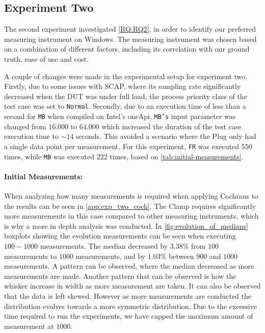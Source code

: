 \subsection{Experiment Two}\label{subsec:exp_two}

The second experiment investigated \cref{RQ:RQ2}, in order to identify our preferred measuring instrument on Windows. The measuring instrument was chosen based on a combination of different factors, including its correlation with our ground truth, ease of use and cost. 

A couple of changes were made in the experimental setup for experiment two. Firstly, due to some issues with SCAP, where its sampling rate significantly decreased when the DUT was under full load, the process priority class of the test case was set to \texttt{Normal}. Secondly, due to an execution time of less than a second for \texttt{MB} when compiled on Intel's oneApi, \texttt{MB's} input parameter was changed from $16.000$ to $64.000$ which increased the duration of the test case execution time to $\sim 14$ seconds. This avoided a scenario where the Plug only had a single data point per measurement. For this experiment, \texttt{FR} was executed $550$ times, while \texttt{MB} was executed $222$ times, based on \cref{tab:initial-measurements}.

\paragraph{Initial Measurements:} When analyzing how many measurements is required when applying Cochrans to the results can be seen in \cref{app:exp_two_coch}. %
The Clamp requires significantly more measurements in this case compared to other measuring instruments, which is why a more in depth analysis was conducted. In \cref{fig:evolution_of_medians} boxplots showing the evolution measurements can be seen when executing $100-1000$ measurements. The median decreased by $3.38\%$ from $100$ measurements to $1000$ measurements, and by $1.03\%$ between $900$ and $1000$ measurements. A pattern can be observed, where the median decreased as more measurements are made. Another pattern that can be observed is how the whisker increase in width as more measurement are taken. It can also be observed that the data is left skewed. However as more measurements are conducted the distribution evolves towards a more symmetric distribution. Due to the excessive time required to run the experiments, we have capped the maximum amount of measurement at $1000$.

